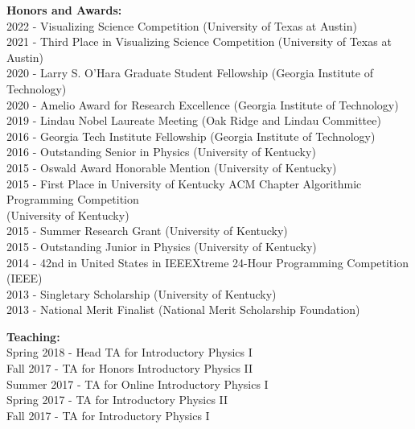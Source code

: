\documentclass[11pt]{article}
\begin{document}
\begin{flushleft}
  \textbf{Honors and Awards:}\\
  2022 - Visualizing Science Competition (University of Texas at Austin)\\
  2021 - Third Place in Visualizing Science Competition (University of Texas at Austin)\\
  2020 - Larry S. O'Hara Graduate Student Fellowship (Georgia Institute of Technology)\\
  2020 - Amelio Award for Research Excellence (Georgia Institute of Technology)\\
  2019 - Lindau Nobel Laureate Meeting (Oak Ridge and Lindau Committee)\\
  2016 - Georgia Tech Institute Fellowship (Georgia Institute of Technology)\\
  2016 - Outstanding Senior in Physics (University of Kentucky)\\
  2015 - Oswald Award Honorable Mention (University of Kentucky)\\
  \vspace{2px}
  2015 - First Place in University of Kentucky ACM Chapter Algorithmic Programming Competition\\ 
  \hspace{29px} (University of Kentucky)\\
  2015 - Summer Research Grant (University of Kentucky)\\
  2015 - Outstanding Junior in Physics (University of Kentucky)\\
  2014 - 42nd in United States in IEEEXtreme 24-Hour Programming Competition (IEEE)\\
  2013 - Singletary Scholarship (University of Kentucky)\\
  2013 - National Merit Finalist (National Merit Scholarship Foundation)\\

\vspace{8px}

  \textbf{Teaching:}\\
  Spring 2018 - Head TA for Introductory Physics I\\
  Fall 2017 - TA for Honors Introductory Physics II\\
  Summer 2017 - TA for Online Introductory Physics I\\
  Spring 2017 - TA for Introductory Physics II\\
  Fall 2017 - TA for Introductory Physics I\\
 
  \vspace{8px}   
 

\end{flushleft}
\end{document}
